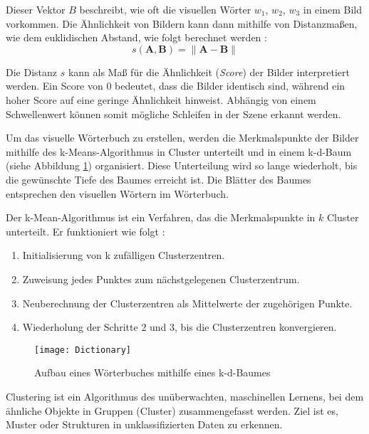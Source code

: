 Dieser Vektor \( B \) beschreibt, wie oft die visuellen Wörter \( w_1 \), \( w_2 \), \( w_3 \) in einem Bild vorkommen. Die Ähnlichkeit von Bildern kann dann mithilfe von Distanzmaßen, wie dem euklidischen Abstand, wie folgt berechnet werden \cite{gao2021vSLAM}:
\begin{equation}
    s(\mathbf{A}, \mathbf{B}) = \|\mathbf{A} - \mathbf{B}\|
\end{equation}

Die Distanz \( s \) kann als Maß für die Ähnlichkeit (\emph{Score}) der Bilder interpretiert werden. Ein Score von 0 bedeutet, dass die Bilder identisch sind, während ein hoher Score auf eine geringe Ähnlichkeit hinweist. Abhängig von einem Schwellenwert können somit mögliche Schleifen in der Szene erkannt werden. \cite{gao2021vSLAM}

Um das visuelle Wörterbuch zu erstellen, werden die Merkmalspunkte der Bilder mithilfe des k-Means-Algorithmus in Cluster unterteilt und in einem k-d-Baum (siehe Abbildung \ref{fig:Dictionary}) organisiert. Diese Unterteilung wird so lange wiederholt, bis die gewünschte Tiefe des Baumes erreicht ist. Die Blätter des Baumes entsprechen den visuellen Wörtern im Wörterbuch. \cite{gao2021vSLAM}

Der k-Mean-Algorithmus ist ein Verfahren, das die Merkmalspunkte in \( k \) Cluster unterteilt. Er funktioniert wie folgt \cite{teynor2024ml}:

\begin{enumerate}
    \item Initialisierung von k zufälligen Clusterzentren.
    \item Zuweisung jedes Punktes zum nächstgelegenen Clusterzentrum.
    \item Neuberechnung der Clusterzentren als Mittelwerte der zugehörigen Punkte.
    \item Wiederholung der Schritte 2 und 3, bis die Clusterzentren konvergieren.
\end{enumerate}

\begin{figure}
    \centering
    \texttt{[image: Dictionary]}
    \caption{Aufbau eines Wörterbuches mithilfe eines k-d-Baumes \cite{gao2021vSLAM}\label{fig:Dictionary}}\par
\end{figure}

\begin{tcolorbox}[colback=THAi-Blue!20!white, colframe=THAi-Blue]
    Clustering ist ein Algorithmus des unüberwachten, maschinellen Lernens, bei dem ähnliche Objekte in Gruppen (Cluster) zusammengefasst werden. Ziel ist es, Muster oder Strukturen in unklassifizierten Daten zu erkennen. \cite{wikipedia2025clusteranalyse}
\end{tcolorbox}

